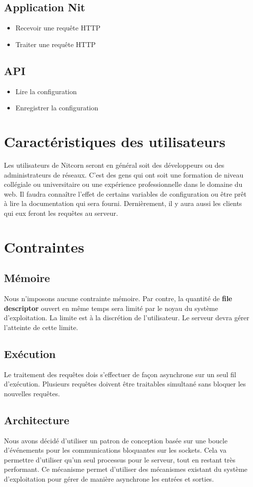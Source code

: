 \documentclass{scrreprt}
\begin{document}
\subsection{Application Nit}
\begin{itemize}
 \item Recevoir une requête HTTP
 \item Traiter une requête HTTP
\end{itemize}
\subsection{API}
\begin{itemize}
 \item Lire la configuration
 \item Enregistrer la configuration
\end{itemize}
\section{Caractéristiques des utilisateurs}
Les utilisateurs de Nitcorn seront en général soit des développeurs ou des
administrateurs de réseaux. C'est des gens qui ont soit une formation de
niveau collégiale ou universitaire ou une expérience professionnelle dans
le domaine du web. Il faudra connaître l'effet de certains variables de
configuration ou être prêt à lire la documentation qui sera fourni.
Dernièrement, il y aura aussi les clients qui eux feront les requêtes
au serveur.
\section{Contraintes}

\subsection{Mémoire}
Nous n'imposons aucune contrainte mémoire. Par contre, la quantité de
\textbf{file descriptor} ouvert en même temps sera limité par le noyau du
système d'exploitation. La limite est à la discrétion de l'utilisateur. Le
serveur devra gérer l'atteinte de cette limite.
\subsection{Exécution}
Le traitement des requêtes dois s'effectuer de façon asynchrone sur un seul fil
d'exécution. Plusieurs requêtes doivent être traitables simultané sans bloquer
les nouvelles requêtes.
\subsection{Architecture}
Nous avons décidé d'utiliser un patron de conception basée sur
une boucle d’événements pour les communications bloquantes sur les sockets. Cela va permettre d'utiliser qu'un seul processus pour le serveur, tout en restant très
performant.
Ce mécanisme permet d'utiliser des mécanismes existant du système d'exploitation
pour gérer de manière asynchrone les entrées et sorties\cite{c10k}.
\end{document}
